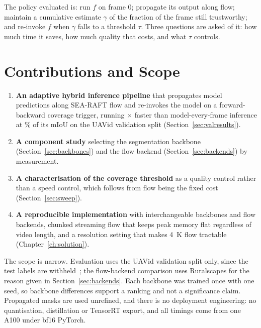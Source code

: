 \documentclass[report.tex]{subfiles}
\begin{document}
The policy evaluated is: run $f$ on frame $0$; propagate its output along flow;
maintain a cumulative estimate $\gamma$ of the fraction of the frame still
trustworthy; and re-invoke $f$ when $\gamma$ falls to a threshold $\tau$. Three
questions are asked of it: how much time it saves, how much quality that costs,
and what $\tau$ controls.

\section{Contributions and Scope}
\label{sec:contributions}

\begin{enumerate}
    \item \textbf{An adaptive hybrid inference pipeline} that propagates model
          predictions along SEA-RAFT flow and re-invokes the model on a
          forward-backward coverage trigger, running \Speedup$\times$ faster
          than model-every-frame inference at \Retention\% of its mIoU on the
          UAVid validation split (Section~\ref{sec:valresults}).
    \item \textbf{A component study} selecting the segmentation backbone
          (Section~\ref{sec:backbones}) and the flow backend
          (Section~\ref{sec:backends}) by measurement.
    \item \textbf{A characterisation of the coverage threshold} as a quality
          control rather than a speed control, which follows from flow being
          the fixed cost (Section~\ref{sec:sweep}).
    \item \textbf{A reproducible implementation} with interchangeable backbones
          and flow backends, chunked streaming flow that keeps peak memory flat
          regardless of video length, and a resolution setting that makes
          \SI{4}{K} flow tractable (Chapter~\ref{ch:solution}).
\end{enumerate}

The scope is narrow. Evaluation uses the UAVid validation split only, since the
test labels are withheld~\cite{uavid2020}; the flow-backend comparison uses
Ruralscapes for the reason given in Section~\ref{sec:backends}. Each backbone
was trained once with one seed, so backbone differences support a ranking and
not a significance claim. Propagated masks are used unrefined, and there is no
deployment engineering: no quantisation, distillation or TensorRT export, and
all timings come from one A100 under bf16 PyTorch.
\end{document}
